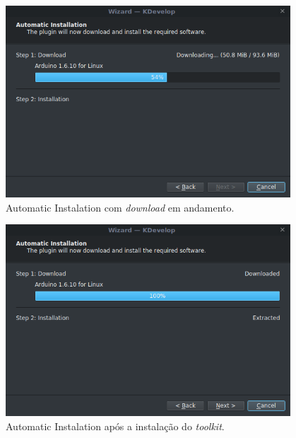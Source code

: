 \begin{figure}[!htb]
  \centering
  \caption[Automatic Instalation executando Download]{Automatic Instalation com \textit{download} em andamento.}
  \label{fig:kdevelopinstaller21}
  \includegraphics[width=0.95\textwidth]{figuras/kdevelopInstaller21.png}
\end{figure}

\begin{figure}[!htb]
  \centering
  \caption[Automatic Instalation pós instalação]{Automatic Instalation após a instalação do \textit{toolkit}.}
  \label{fig:kdevelopinstaller22}
  \includegraphics[width=0.95\textwidth]{figuras/kdevelopInstaller22.png}
\end{figure}

